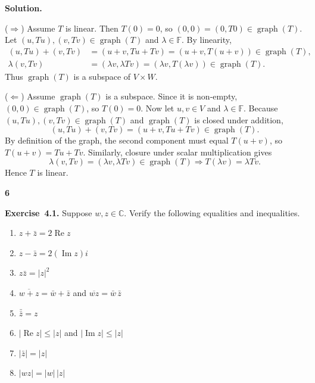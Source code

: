 \documentclass[11pt]{article}
\newcommand{\ProblemDivider}[1]{%
  \vspace{1.0em}
  \noindent\textbf{#1}\par
  \vspace{0.35em}
}
\newcommand{\ProblemAnnounce}{\noindent}
\newcommand{\SolutionAnnounce}{\noindent\textbf{Solution.}\par\medskip}
\newcommand{\Exercise}[1]{\textbf{Exercise~#1.}\;}
\newcommand{\C}{\mathbb{C}}
\newcommand{\F}{\mathbb{F}}
\begin{document}
\begin{solutionBox}
\SolutionAnnounce
\doublespacing

($\Rightarrow$) Assume $T$ is linear. Then $T(0)=0$, so $(0,0) = (0,T0) \in \operatorname{graph}(T)$. Let $(u,Tu), (v,Tv) \in \operatorname{graph}(T)$ and $\lambda \in \F$. By linearity,
\begin{align*}
(u,Tu) + (v,Tv) &= (u+v, Tu+Tv) = (u+v, T(u+v)) \in \operatorname{graph}(T),\\
\lambda (v,Tv) &= (\lambda v, \lambda Tv) = (\lambda v, T(\lambda v)) \in \operatorname{graph}(T).
\end{align*}
Thus $\operatorname{graph}(T)$ is a subspace of $V \times W$.

($\Leftarrow$) Assume $\operatorname{graph}(T)$ is a subspace. Since it is non‑empty, $(0,0) \in \operatorname{graph}(T)$, so $T(0)=0$. Now let $u,v \in V$ and $\lambda \in \F$. Because $(u,Tu), (v,Tv) \in \operatorname{graph}(T)$ and $\operatorname{graph}(T)$ is closed under addition,
\[
(u,Tu)+(v,Tv) = (u+v, Tu+Tv) \in \operatorname{graph}(T).
\]
By definition of the graph, the second component must equal $T(u+v)$, so $T(u+v)=Tu+Tv$. Similarly, closure under scalar multiplication gives
\[
\lambda(v,Tv) = (\lambda v, \lambda Tv) \in \operatorname{graph}(T) \Rightarrow T(\lambda v) = \lambda Tv.
\]
Hence $T$ is linear.
\end{solutionBox}

\ProblemDivider{6}

\begin{problemBox}
\ProblemAnnounce
\Exercise{4.1}
Suppose $w, z \in \C$. Verify the following equalities and inequalities.
\begin{enumerate}
  \item[(a)] $z + \bar{z} = 2\operatorname{Re} z$
  \item[(b)] $z - \bar{z} = 2(\operatorname{Im} z)i$
  \item[(c)] $z\bar{z} = |z|^2$
  \item[(d)] $\overline{w+z} = \bar{w} + \bar{z}$ and $\overline{wz} = \bar{w}\,\bar{z}$
  \item[(e)] $\bar{\bar{z}} = z$
  \item[(f)] $|\operatorname{Re} z| \leq |z|$ and $|\operatorname{Im} z| \leq |z|$
  \item[(g)] $|\bar{z}| = |z|$
  \item[(h)] $|wz| = |w|\,|z|$
\end{enumerate}
\end{problemBox}
\end{document}
